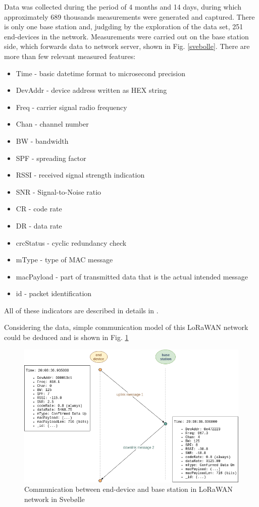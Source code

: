 \documentclass[11pt, a4paper]{article} %
\begin{document}
Data was collected during the period of 4 months and 14 days, during which approximately 689 thousands measurements were generated and captured. 
There is only one base station and, judgding by the exploration of the data set, 251 end-devices in the network.
Measurements were carried out on the base station side, which forwards data to network server, shown in Fig. \ref{svebolle}. There are more than few relevant measured features:
\begin{itemize}
	\item Time - basic datetime format to microsecond precision
    \item DevAddr - device address written as HEX string
    \item Freq - carrier signal radio frequency
    \item Chan - channel number
    \item BW - bandwidth
    \item SPF - spreading factor
    \item RSSI - received signal strength indication
    \item SNR - Signal-to-Noise ratio
    \item CR - code rate 
    \item DR - data rate
    \item crcStatus - cyclic redundancy check
    \item mType - type of MAC message
    \item macPayload - part of transmitted data that is the actual intended message
    \item id - packet identification
\end{itemize}

All of these indicators are described in details in \cite{Aloys_LoRa}.

Considering the data, simple communication model of this LoRaWAN network could be deduced and is shown in Fig. \ref{communication}
\begin{figure}
	\centering
	\includegraphics[scale=.5]{images/Svebolle-ed-bs-model.png} %
	\caption{Communication between end-device and base station in LoRaWAN network in Svebølle} %
	\label{communication} 
\end{figure}
\end{document}
